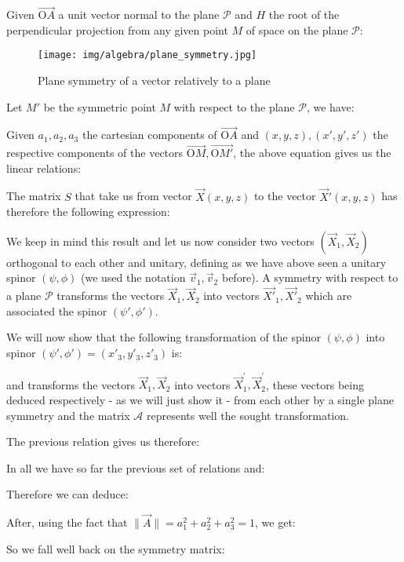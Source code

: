 	Given $\overrightarrow{\text{O}A}$ a unit vector normal to the plane $\mathcal{P}$ and $H$  the root of the perpendicular projection from any given point $M$ of space on the plane $\mathcal{P}$:
	
	\begin{figure}[H]
		\centering
		\texttt{[image: img/algebra/plane\_symmetry.jpg]}
		\caption[]{Plane symmetry of a vector relatively to a plane}
	\end{figure}
	Let $M'$ be the symmetric point $M$ with respect to the plane $\mathcal{P}$, we have:
	
	Given $a_1,a_2,a_3$ the cartesian components of $\overrightarrow{\text{O}A}$ and $(x,y,z),(x',y',z')$ the respective components of the vectors $\overrightarrow{\text{O}M},\overrightarrow{\text{O}M'}$, the above equation gives us the linear relations:
	
	The matrix $S$ that take us from vector $\vec{X}(x,y,z)$ to the vector $\vec{X}'(x,y,z)$ has therefore the following expression:
	
	We keep in mind this result and let us now consider two vectors $(\vec{X}_1,\vec{X}_2)$ orthogonal to each other and unitary, defining as we have above  seen a unitary spinor $(\psi,\phi)$ (we used the notation $\vec{v}_1,\vec{v}_2$ before). A symmetry with respect to a plane $\mathcal{P}$ transforms the vectors $\vec{X}_1,\vec{X}_2$ into vectors $\vec{X'}_1,\vec{X'}_2$ which are associated the spinor $(\psi',\phi')$. 
	
	\begin{theorem}
	We will now show that the following transformation of the spinor $(\psi,\phi)$ into spinor $(\psi',\phi')=(x'_3,y'_3,z'_3)$ is:
	
	\end{theorem}
	and transforms the vectors $\vec{X}_1,\vec{X}_2$ into vectors $\vec{X}_1^{\prime},\vec{X}_2^{\prime}$, these vectors being deduced respectively - as we will just show it - from each other by a single plane symmetry and the matrix $\mathcal{A}$ represents well the sought transformation.
	
	The previous relation gives us therefore:
	
	In all we have so far the previous set of relations and:
	
	Therefore we can deduce:
	
	After, using the fact that $\|\vec{A}\|=a_1^2+a_2^2+a_3^2=1$, we get:
	
	So we fall well back on the symmetry matrix:
	
